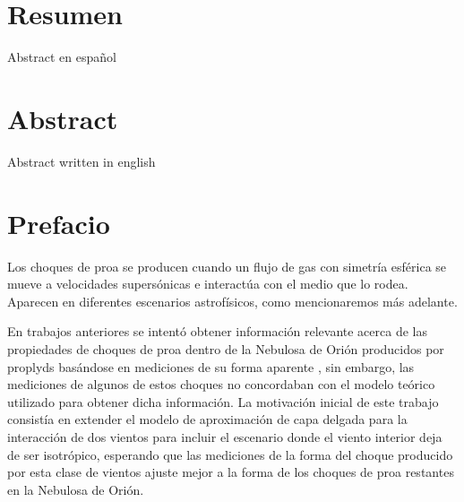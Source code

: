 \documentclass[11pt, twoside]{book}
\begin{document}
\section*{Resumen}
  Abstract en español

\newpage
\section*{Abstract}
  Abstract written in english

\newpage
\section*{\centering Prefacio}

Los choques de proa se producen cuando un flujo de gas con simetría esférica se mueve a velocidades supersónicas e interactúa con el medio que lo rodea. Aparecen en diferentes escenarios astrofísicos, como mencionaremos más adelante.

En trabajos anteriores se intentó obtener información relevante acerca de las propiedades de choques de proa dentro de la Nebulosa de Orión producidos por proplyds basándose en mediciones de su forma aparente \citep{Robberto:2005}, sin embargo, las mediciones de algunos de estos choques no concordaban con el modelo teórico utilizado para obtener dicha información. La motivación inicial de este trabajo consistía en extender el modelo de aproximación de capa delgada para la interacción de dos vientos \citep{Canto:1996} para incluir el escenario donde el viento interior deja de ser isotrópico, esperando que las mediciones de la forma del choque producido por esta clase de vientos ajuste mejor a la forma de los choques de proa restantes en la Nebulosa de Orión.
\end{document}
